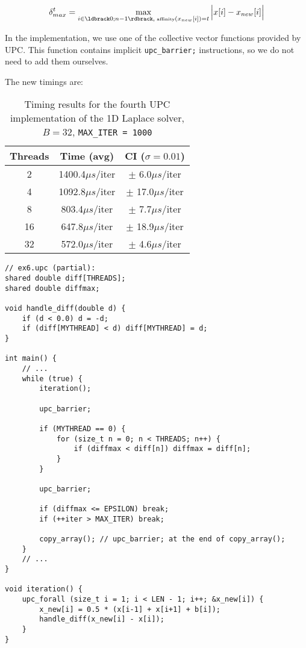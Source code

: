 \documentclass[12pt]{article}
\newcommand{\us}[0]{${\mu}s$}
\begin{document}
$$\delta_{max}^t = \max_{i\in \ldbrack 0; n-1 \rdbrack, \; \textrm{\tiny affinity}(x_{new}[i]) = t}{\Bigl\vert x[i]-x_{new}[i] \Bigr\vert}$$

In the implementation, we use one of the collective vector functions provided by UPC.
This function contains implicit \texttt{upc\_barrier;} instructions, so we do not need to add them ourselves.

The new timings are:

\begin{table}[ht]
  \centering\begin{tabular}{|c|c|c|}
    \hline
    Threads & Time (avg) & CI ($\sigma=0.01$) \\
    \hline
    2 & 1400.4\us/iter & $\pm$ 6.0\us/iter \\
    4 & 1092.8\us/iter & $\pm$ 17.0\us/iter \\
    8 & 803.4\us/iter & $\pm$ 7.7\us/iter \\
    16 & 647.8\us/iter & $\pm$ 18.9\us/iter \\
    32 & 572.0\us/iter & $\pm$ 4.6\us/iter \\
    \hline
  \end{tabular}
  \caption{Timing results for the fourth UPC implementation of the 1D Laplace solver, $B = 32$, \texttt{MAX\_ITER = 1000}}
  \label{tab:laplace6}
\end{table}

\begin{lstlisting}[style=C, caption={Excerpt from ex6.upc: new \texttt{handle\_diff} function and calculation of \texttt{diffmax}}, label={lst:laplace6}]
// ex6.upc (partial):
shared double diff[THREADS];
shared double diffmax;

void handle_diff(double d) {
    if (d < 0.0) d = -d;
    if (diff[MYTHREAD] < d) diff[MYTHREAD] = d;
}

int main() {
    // ...
    while (true) {
        iteration();

        upc_barrier;

        if (MYTHREAD == 0) {
            for (size_t n = 0; n < THREADS; n++) {
                if (diffmax < diff[n]) diffmax = diff[n];
            }
        }

        upc_barrier;

        if (diffmax <= EPSILON) break;
        if (++iter > MAX_ITER) break;

        copy_array(); // upc_barrier; at the end of copy_array();
    }
    // ...
}

void iteration() {
    upc_forall (size_t i = 1; i < LEN - 1; i++; &x_new[i]) {
        x_new[i] = 0.5 * (x[i-1] + x[i+1] + b[i]);
        handle_diff(x_new[i] - x[i]);
    }
}
\end{lstlisting}
\end{document}

